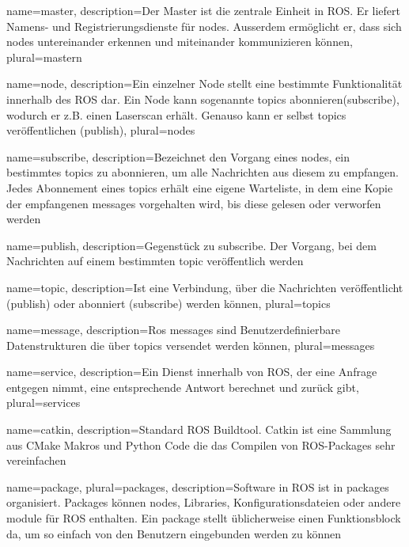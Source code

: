 {
  name={master},
  description={Der Master ist die zentrale Einheit in ROS. Er liefert Namens- und Registrierungsdienste für \Glspl{node}. 
  Ausserdem ermöglicht er, dass sich \Glspl{node} untereinander erkennen und miteinander kommunizieren können},
  plural={mastern}
}

{
  name={node},
  description={Ein einzelner Node stellt eine bestimmte Funktionalität innerhalb des ROS dar. 
  Ein Node kann sogenannte \Glspl{topic} abonnieren(\gls{subscribe}), wodurch er z.B. einen Laserscan erhält. 
  Genauso kann er selbst \Glspl{topic} veröffentlichen (\gls{publish})},
  plural={nodes}
}

{
  name={subscribe},
  description={Bezeichnet den Vorgang eines \Gls{node}s, ein bestimmtes \glspl{topic} zu abonnieren, um alle Nachrichten aus diesem zu empfangen.
  Jedes Abonnement eines \Gls{topic}s erhält eine eigene Warteliste, in dem eine Kopie der empfangenen \Glspl{message} vorgehalten wird, bis diese gelesen oder verworfen werden}
}

{
  name={publish},
  description={Gegenstück zu \gls{subscribe}.
  Der Vorgang, bei dem Nachrichten auf einem bestimmten \gls{topic} veröffentlich werden}
}

{
  name={topic},
  description={Ist eine Verbindung, über die Nachrichten veröffentlicht (\gls{publish}) oder abonniert (\gls{subscribe}) werden können},
  plural={topics}
}

{
  name={message},
  description={Ros messages sind Benutzerdefinierbare Datenstrukturen die über \Glspl{topic} versendet werden können},
  plural={messages}
}

{
  name={service},
  description={Ein Dienst innerhalb von ROS, der eine Anfrage entgegen nimmt, eine entsprechende Antwort berechnet und zurück gibt},
  plural={services}
}

{
  name={catkin},
  description={Standard ROS Buildtool. Catkin ist eine Sammlung aus CMake Makros und Python Code die das Compilen von ROS-Packages sehr vereinfachen}
}

{
  name={package},
  plural={packages},
  description={Software in ROS ist in packages organisiert. Packages können \Glspl{node}, Libraries, Konfigurationsdateien oder andere module für ROS enthalten. Ein package stellt üblicherweise einen Funktionsblock da, um so einfach von den Benutzern eingebunden werden zu können}
}

